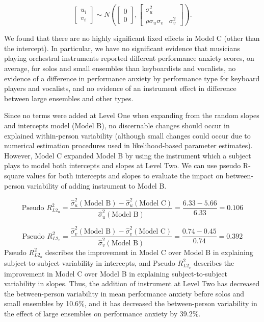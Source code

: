 \documentclass[
]{krantz}
\begin{document}
\[ \left[ \begin{array}{c}
            u_{i} \\ v_{i}
          \end{array}  \right] \sim N \left( \left[
          \begin{array}{c}
            0 \\ 0
          \end{array} \right], \left[
          \begin{array}{cc}
            \sigma_{u}^{2} & \\
            \rho\sigma_{u}\sigma_{v} & \sigma_{v}^{2}
          \end{array} \right] \right). \]

We found that there are no highly significant fixed effects in Model C (other than the intercept). In particular, we have no significant evidence that musicians playing orchestral instruments reported different performance anxiety scores, on average, for solos and small ensembles than keyboardists and vocalists, no evidence of a difference in performance anxiety by performance type for keyboard players and vocalists, and no evidence of an instrument effect in difference between large ensembles and other types.

Since no terms were added at Level One when expanding from the random slopes and intercepts model (Model B), no discernable changes should occur in explained within-person variability (although small changes could occur due to numerical estimation procedures used in likelihood-based parameter estimates). However, Model C expanded Model B by using the instrument which a subject plays to model both intercepts and slopes at Level Two. We can use pseudo R-square values for both intercepts and slopes to evaluate the impact on between-person variability of adding instrument to Model B.

\begin{equation*}
\textrm{Pseudo }R^2_{L2_u} = \frac{\hat{\sigma}_{u}^{2}(\textrm{Model B})-\hat{\sigma}_{u}^{2}(\textrm{Model C})}{\hat{\sigma}_{u}^{2}(\textrm{Model B})} = \frac{6.33-5.66}{6.33} = 0.106
\end{equation*}

\begin{equation*}
\textrm{Pseudo }R^2_{L2_v} = \frac{\hat{\sigma}_{v}^{2}(\textrm{Model B})-\hat{\sigma}_{v}^{2}(\textrm{Model C})}{\hat{\sigma}_{v}^{2}(\textrm{Model B})} = \frac{0.74-0.45}{0.74} = 0.392
\end{equation*}
\(\textrm{Pseudo }R^2_{L2_u}\) describes the improvement in Model C over Model B in explaining subject-to-subject variability in intercepts, and \(\textrm{Pseudo }R^2_{L2_v}\) describes the improvement in Model C over Model B in explaining subject-to-subject variability in slopes. Thus, the addition of instrument at Level Two has decreased the between-person variability in mean performance anxiety before solos and small ensembles by 10.6\%, and it has decreased the between-person variability in the effect of large ensembles on performance anxiety by 39.2\%.
\end{document}
